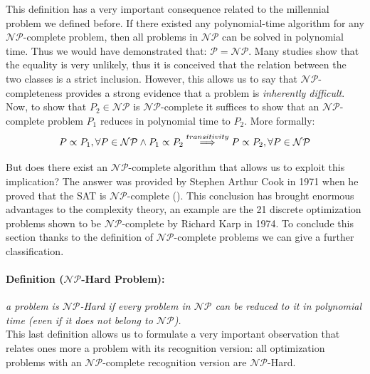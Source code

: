 \documentclass[english]{article}
\begin{document}
			 This definition has a very important consequence related to the millennial problem we defined before. If there existed any polynomial-time algorithm for any $\mathcal{N}\mathcal{P}$-complete problem, then all problems in $\mathcal{N}\mathcal{P}$ can be solved in polynomial time. Thus we would have demonstrated that: $\mathcal{P}=\mathcal{N}\mathcal{P}$. Many studies show that the equality is very unlikely, thus it is conceived that the relation between the two classes is a strict inclusion. However, this allows us to say that $\mathcal{N}\mathcal{P}$-completeness provides a strong evidence that a problem is \emph{inherently difficult}. Now, to show that $P_2\in\mathcal{N}\mathcal{P}$ is $\mathcal{N}\mathcal{P}$-complete it suffices to show that an $\mathcal{N}\mathcal{P}$-complete problem $P_1$ reduces in polynomial time to $P_2$. More formally:
			 \begin{equation*}
			 	\centering
			 	P\propto P_1, \forall P\in\mathcal{N}\mathcal{P} \land P_1 \propto P_2 \overset{transitivity}{\implies} P\propto P_2, \forall P\in \mathcal{N}\mathcal{P}
			 \end{equation*}
			 
			 But does there exist an $\mathcal{N}\mathcal{P}$-complete algorithm that allows us to exploit this implication? The answer was provided by Stephen Arthur Cook in 1971 when he proved that the SAT is $\mathcal{N}\mathcal{P}$-complete (\cite[Stephen A. Cook]{CookSAT}). This conclusion has brought enormous advantages to the complexity theory, an example are the 21 discrete optimization problems shown to be $\mathcal{N}\mathcal{P}$-complete by Richard Karp in 1974. To conclude this section thanks to the definition of $\mathcal{N}\mathcal{P}$-complete problems we can give a further classification.
			 
			 \paragraph{Definition ($\mathcal{N}\mathcal{P}$-Hard Problem):} \emph{a problem is $\mathcal{N}\mathcal{P}$-Hard if every problem in $\mathcal{N}\mathcal{P}$ can be reduced to it in polynomial time (even if it does not belong to $\mathcal{N}\mathcal{P}$).} \\
			 
			 This last definition allows us to formulate a very important observation that relates ones more a problem with its recognition version: all optimization problems with an $\mathcal{N}\mathcal{P}$-complete recognition version are $\mathcal{N}\mathcal{P}$-Hard.
			 
\end{document}
